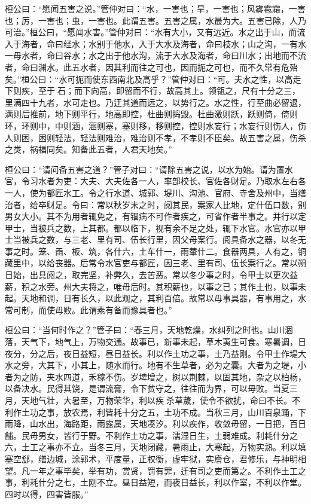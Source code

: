 \documentclass[]{article}
\begin{document}
桓公曰：``愿闻五害之说。''管仲对曰：``水，一害也；旱，一害也；风雾雹霜，一害也；厉，一害也；虫，一害也。此谓五害。五害之属，水最为大。五害已除，人乃可治。''桓公曰，``愿闻水害。''管仲对曰：``水有大小，又有远近。水之出于山，而流入于海者，命曰经水；水别于他水，入于大水及海者，命曰枝水；山之沟，一有水一毋水者，命曰谷水；水之出于他水沟，流于大水及海者，命曰川水；出地而不流者，命曰渊水。此五水者，因其利而往之可也，因而扼之可也，而不久常有危殆矣。''桓公曰：``水可扼而使东西南北及高乎？''管仲对曰：``可。夫水之性，以高走下则疾，至于石；而下向高，即留而不行，故高其上。领瓴之，尺有十分之三，里满四十九者，水可走也。乃迂其道而远之，以势行之。水之性，行至曲必留退，满则后推前，地下则平行，地高即控，杜曲则捣毁。杜曲激则跃，跃则倚，倚则环，环则中，中则涵，涵则塞，塞则移，移则控，控则水妄行；水妄行则伤人，伤人则困，困则轻法，轻法则难治，难治则不孝，不孝则不臣矣。故五害之属，伤杀之类，祸福同矣。知备此五者，人君天地矣。''

桓公曰：``请问备五害之道？''管子对曰：``请除五害之说，以水为始。请为置水官，令习水者为吏：大夫、大夫佐各一人，率部校长、官佐各财足。乃取水左右各一人，使为都匠水工。令之行水道、城郭、堤川、沟池、官府、寺舍及州中，当缮治者，给卒财足。令曰：常以秋岁末之时，阅其民，案家人比地，定什伍口数，别男女大小。其不为用者辄免之，有锢病不可作者疾之，可省作者半事之。并行以定甲士，当被兵之数，上其都。都以临下，视有余不足之处，辄下水官。水官亦以甲士当被兵之数，与三老、里有司、伍长行里，因父母案行。阅具备水之器，以冬无事之时。笼、臿、板、筑，各什六，土车什一，雨輂什二。食器两具，人有之，铜藏里中，以给丧器。后常令水官吏与都匠，因三老、里有司、伍长案行之。常以朔日始，出具阅之，取完坚，补弊久，去苦恶。常以冬少事之时，令甲士以更次益薪，积之水旁。州大夫将之，唯毋后时。其积薪也，以事之已；其作土也，以事未起。天地和调，日有长久，以此观之，其利百倍。故常以毋事具器，有事用之，水常可制，而使毋败。此谓素有备而豫具者也。''

桓公曰：``当何时作之？''管子曰：``春三月，天地乾燥，水纠列之时也。山川涸落，天气下，地气上，万物交通。故事已，新事未起，草木荑生可食。寒暑调，日夜分，分之后，夜日益短，昼日益长。利以作土功之事，土乃益刚。令甲士作堤大水之旁，大其下，小其上，随水而行。地有不生草者，必为之囊。大者为之堤，小者为之防，夹水四道，禾稼不伤。岁埤增之，树以荆棘，以固其地，杂之以柏杨，以备决水。民得其饶，是谓流膏，令下贫守之，往往而为界，可以毋败。当夏三月，天地气壮，大暑至，万物荣华，利以疾杀草薉，使令不欲扰，命曰不长。不利作土功之事，放农焉，利皆耗十分之五，土功不成。当秋三月，山川百泉踊，下雨降，山水出，海路距，雨露属，天地凑汐。利以疾作，收敛毋留，一日把，百日餔。民毋男女，皆行于野。不利作土功之事，濡湿日生，土弱难成。利耗什分之六，土工之事亦不立。当冬三月，天地闭藏，暑雨止，大寒起，万物实熟。利以填塞空郄，缮边城，涂郭术，平度量，正权衡，虚牢狱，实廥仓，君修乐，与神明相望。凡一年之事毕矣，举有功，赏贤，罚有罪，迁有司之吏而第之。不利作土工之事，利耗什分之七，土刚不立。昼日益短，而夜日益长，利以作室，不利以作堂。四时以得，四害皆服。''
\end{document}
